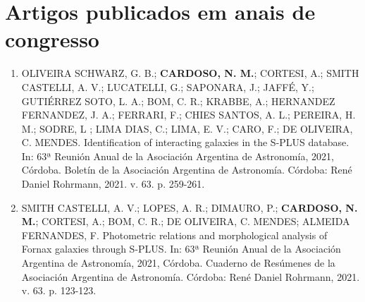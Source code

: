 \section{Artigos publicados em anais de congresso}
\label{sec:artigos-congresso}
\begin{enumerate}
  \item OLIVEIRA SCHWARZ, G. B.; \textbf{CARDOSO, N. M.}; CORTESI, A.; SMITH CASTELLI, A. V.; LUCATELLI, G.; SAPONARA, J.; JAFFÉ, Y.; GUTIÉRREZ SOTO, L. A.; BOM, C. R.; KRABBE, A.; HERNANDEZ FERNANDEZ, J. A.; FERRARI, F.; CHIES SANTOS, A. L.; PEREIRA, H. M.; SODRE, L ; LIMA DIAS, C.; LIMA, E. V.; CARO, F.; DE OLIVEIRA, C. MENDES. Identification of interacting galaxies in the S-PLUS database. In: 63ª Reunión Anual de la Asociación Argentina de Astronomía, 2021, Córdoba. Boletín de la Asociación Argentina de Astronomía. Córdoba: René Daniel Rohrmann, 2021. v. 63. p. 259-261.
  \item  SMITH CASTELLI, A. V.; LOPES, A. R.; DIMAURO, P.; \textbf{CARDOSO, N. M.}; CORTESI, A.; BOM, C. R.; DE OLIVEIRA, C. MENDES; ALMEIDA FERNANDES, F. Photometric relations and morphological analysis of Fornax galaxies through S-PLUS. In: 63ª Reunión Anual de la Asociación Argentina de Astronomía, 2021, Córdoba. Cuaderno de Resúmenes de la Asociación Argentina de Astronomía. Córdoba: René Daniel Rohrmann, 2021. v. 63. p. 123-123.
\end{enumerate}



